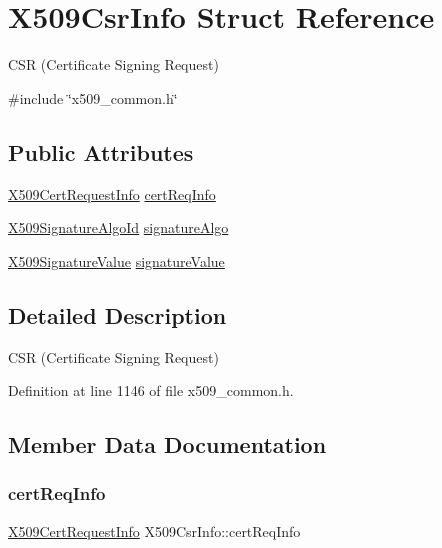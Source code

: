 \hypertarget{structX509CsrInfo}{}\section{X509\+Csr\+Info Struct Reference}
\label{structX509CsrInfo}


C\+SR (Certificate Signing Request)  




{\ttfamily \#include \char`\"{}x509\+\_\+common.\+h\char`\"{}}

\subsection*{Public Attributes}
\begin{DoxyCompactItemize}
\item 
\hyperlink{structX509CertRequestInfo}{X509\+Cert\+Request\+Info} \hyperlink{structX509CsrInfo_a5988c516e1e7ca0c52daf81f02f0cb6c}{cert\+Req\+Info}
\item 
\hyperlink{structX509SignatureAlgoId}{X509\+Signature\+Algo\+Id} \hyperlink{structX509CsrInfo_aa0f75c78d019367fab5baeb5475ac5a1}{signature\+Algo}
\item 
\hyperlink{structX509SignatureValue}{X509\+Signature\+Value} \hyperlink{structX509CsrInfo_a843a90077fa750f9eaf4027436f39d9c}{signature\+Value}
\end{DoxyCompactItemize}


\subsection{Detailed Description}
C\+SR (Certificate Signing Request) 

Definition at line 1146 of file x509\+\_\+common.\+h.



\subsection{Member Data Documentation}
\mbox{\label{structX509CsrInfo_a5988c516e1e7ca0c52daf81f02f0cb6c}} 
\subsubsection{\texorpdfstring{cert\+Req\+Info}{certReqInfo}}
{\footnotesize\ttfamily \hyperlink{structX509CertRequestInfo}{X509\+Cert\+Request\+Info} X509\+Csr\+Info\+::cert\+Req\+Info}



